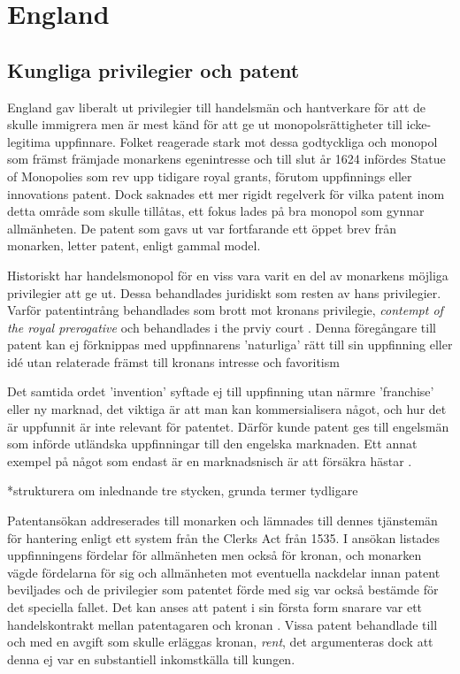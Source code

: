 \section{England} 

\subsection{Kungliga privilegier och patent} 

England gav liberalt ut privilegier till handelsmän och hantverkare för att de skulle immigrera men är
mest känd för att ge ut monopolsrättigheter till icke-legitima uppfinnare. Folket reagerade stark mot
dessa godtyckliga och monopol som främst främjade monarkens egenintresse och till slut år 1624 infördes
Statue of Monopolies som rev upp tidigare royal grants, förutom uppfinnings eller innovations patent.
Dock saknades ett mer rigidt regelverk för vilka patent inom detta område som skulle tillåtas, ett fokus
lades på bra monopol som gynnar allmänheten. De patent som gavs ut var fortfarande ett öppet brev från
monarken, letter patent, enligt gammal model.

Historiskt har handelsmonopol för en viss vara 
varit en del av monarkens möjliga privilegier att ge ut. Dessa behandlades
juridiskt som resten av hans privilegier. Varför patentintrång
behandlades som brott mot kronans privilegie, \emph{contempt of the royal prerogative} och behandlades i the prviy court \cite{macleod}. Denna
föregångare till patent kan ej förknippas med uppfinnarens 'naturliga' rätt till sin uppfinning eller idé
utan relaterade främst till kronans intresse och favoritism \cite{bracha}

Det samtida ordet 'invention' syftade ej till uppfinning utan närmre 'franchise' eller ny marknad, det
viktiga är att man kan kommersialisera något, och hur det är uppfunnit är inte relevant för patentet\cite{bracha}.
Därför kunde patent ges till engelsmän som införde utländska uppfinningar till den engelska marknaden.
Ett annat exempel på något som endast är en marknadsnisch är att försäkra hästar \cite{davies}.


*strukturera om inlednande tre stycken, grunda termer tydligare

Patentansökan addreserades till monarken och lämnades till dennes tjänstemän för hantering enligt ett
system från the Clerks Act från 1535\cite{bracha}. I ansökan listades uppfinningens fördelar för allmänheten men också
för kronan, och monarken vägde fördelarna för sig och allmänheten mot eventuella nackdelar innan patent
beviljades och de privilegier som patentet förde med sig var också bestämde för det speciella fallet. Det
kan anses att patent i sin första form snarare var ett handelskontrakt mellan patentagaren och kronan
\cite{bracha}. Vissa patent behandlade till och med en avgift som skulle erläggas kronan, \emph{rent},
det argumenteras dock att denna ej var en substantiell inkomstkälla till kungen. \cite{macleod2}

